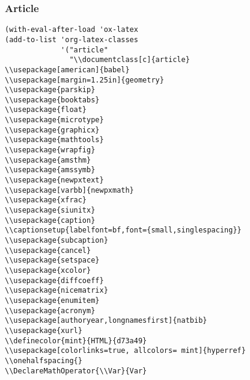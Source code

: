 \documentclass[c]{article}
\DeclareMathOperator{\Var}{Var}
\theoremstyle{plain}%
\theoremstyle{definition}
\theoremstyle{remark}
\begin{document}
\subsubsection{Article}
\label{sec:org42a7371}
\begin{verbatim}
(with-eval-after-load 'ox-latex
(add-to-list 'org-latex-classes
             '("article"
               "\\documentclass[c]{article}
\\usepackage[american]{babel}
\\usepackage[margin=1.25in]{geometry}
\\usepackage{parskip}
\\usepackage{booktabs}
\\usepackage{float}
\\usepackage{microtype}
\\usepackage{graphicx}
\\usepackage{mathtools}
\\usepackage{wrapfig}
\\usepackage{amsthm}
\\usepackage{amssymb}
\\usepackage{newpxtext}
\\usepackage[varbb]{newpxmath}
\\usepackage{xfrac}
\\usepackage{siunitx}
\\usepackage{caption}
\\captionsetup{labelfont=bf,font={small,singlespacing}}
\\usepackage{subcaption}
\\usepackage{cancel}
\\usepackage{setspace}
\\usepackage{xcolor}
\\usepackage{diffcoeff}
\\usepackage{nicematrix}
\\usepackage{enumitem}
\\usepackage{acronym}
\\usepackage[authoryear,longnamesfirst]{natbib}
\\usepackage{xurl}
\\definecolor{mint}{HTML}{d73a49}
\\usepackage[colorlinks=true, allcolors= mint]{hyperref}
\\onehalfspacing{}
\\DeclareMathOperator{\\Var}{Var}

\end{verbatim}
\end{document}

